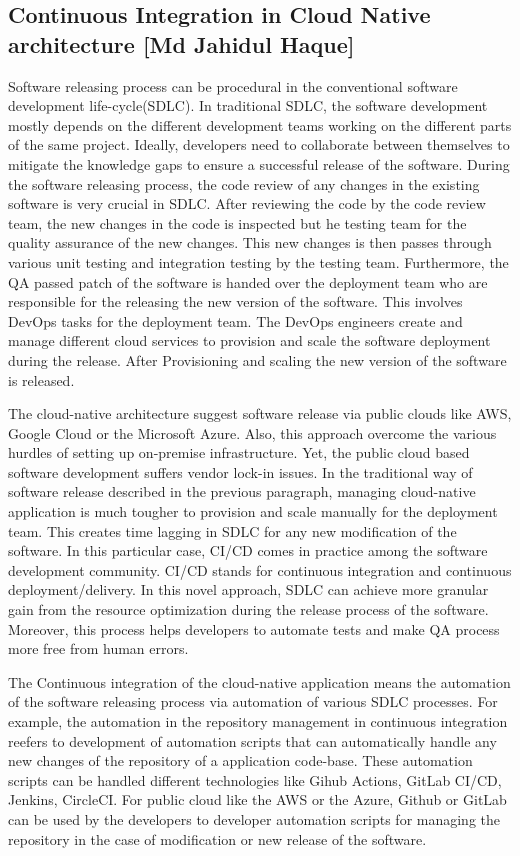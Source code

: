 \subsection{Continuous Integration in Cloud Native architecture [Md Jahidul Haque]}\label{sec:jahidul_sec_1}

Software releasing process can be procedural in the conventional software development life-cycle(SDLC). In traditional SDLC, the software development mostly depends on the different development teams working on the different parts of the same project. Ideally, developers need to collaborate between themselves to mitigate the knowledge gaps to ensure a successful release of the software. During the software releasing process, the code review of any changes in the existing software is very crucial in SDLC. After reviewing the code by the code review team, the new changes in the code is inspected but he testing team for the quality assurance of the new changes. This new changes is then passes through various unit testing and  integration testing by the testing team. Furthermore, the QA passed patch of the software is handed over the deployment team who are responsible for the releasing the new version of the software. This involves DevOps tasks for the deployment team. The DevOps engineers create and manage different cloud services to provision and scale the software deployment during the release. After Provisioning and scaling the new version of the software is released. 

The cloud-native architecture suggest software release via public clouds like AWS, Google Cloud or the Microsoft Azure. Also, this approach overcome the various hurdles of setting up on-premise infrastructure. Yet, the public cloud based software development  suffers vendor lock-in issues. In the traditional way of software release described in the previous paragraph, managing cloud-native application is much tougher to provision and scale manually for the deployment team. This creates time lagging in SDLC for any new modification of the software. In this particular case, CI/CD comes in practice among the software development community. CI/CD stands for continuous integration and continuous deployment/delivery. In this novel approach, SDLC can achieve more granular gain from the resource optimization during the release process of the software. Moreover, this process helps developers to automate tests and make QA process more free from human errors. 

The Continuous integration of the cloud-native application means the automation of the software releasing process via automation of various SDLC processes. For example, the automation in the repository management in continuous integration reefers to development of automation scripts that can automatically handle any new changes of the repository of a application code-base. These automation scripts can be handled different technologies like Gihub Actions, GitLab CI/CD, Jenkins, CircleCI. For public cloud like the AWS or the Azure, Github or GitLab can be used by the developers to developer automation scripts for managing the repository in the case of modification or new release of the software.

